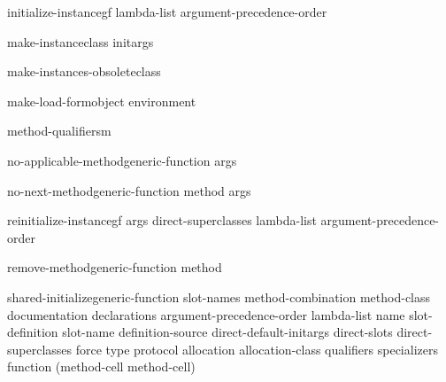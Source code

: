 \documentclass[10pt,english]{book}
\begin{document}
\begin{generic}{initialize-instance}{gf \key lambda-list argument-precedence-order \akeys}
  
\end{generic}

\begin{generic}{make-instance}{class \rest initargs \akeys}
  
\end{generic}

\begin{generic}{make-instances-obsolete}{class}
  
\end{generic}

\begin{generic}{make-load-form}{object \op environment}
  
\end{generic}

\begin{generic}{method-qualifiers}{m}
  
\end{generic}

\begin{generic}{no-applicable-method}{generic-function \rest args}
  
\end{generic}

\begin{generic}{no-next-method}{generic-function method \rest args}
  
\end{generic}

\begin{generic}{reinitialize-instance}{gf \rest args \key direct-superclasses lambda-list argument-precedence-order
 \akeys}
  
\end{generic}

\begin{generic}{remove-method}{generic-function method}
  
\end{generic}

\begin{generic}{shared-initialize}{generic-function slot-names \key method-combination method-class documentation
 declarations argument-precedence-order lambda-list name slot-definition
 slot-name definition-source direct-default-initargs direct-slots
 direct-superclasses force type protocol allocation allocation-class qualifiers
 specializers function (method-cell method-cell) \akeys}
  
\end{generic}
\end{document}
